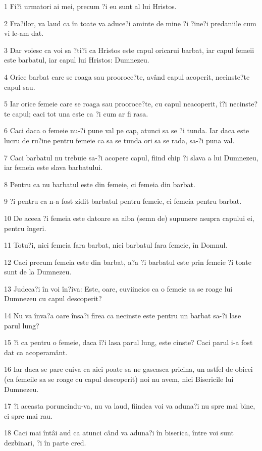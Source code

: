 \par 1 Fi?i urmatori ai mei, precum ?i eu sunt al lui Hristos.
\par 2 Fra?ilor, va laud ca în toate va aduce?i aminte de mine ?i ?ine?i predaniile cum vi le-am dat.
\par 3 Dar voiesc ca voi sa ?ti?i ca Hristos este capul oricarui barbat, iar capul femeii este barbatul, iar capul lui Hristos: Dumnezeu.
\par 4 Orice barbat care se roaga sau prooroce?te, având capul acoperit, necinste?te capul sau.
\par 5 Iar orice femeie care se roaga sau prooroce?te, cu capul neacoperit, î?i necinste?te capul; caci tot una este ca ?i cum ar fi rasa.
\par 6 Caci daca o femeie nu-?i pune val pe cap, atunci sa se ?i tunda. Iar daca este lucru de ru?ine pentru femeie ca sa se tunda ori sa se rada, sa-?i puna val.
\par 7 Caci barbatul nu trebuie sa-?i acopere capul, fiind chip ?i slava a lui Dumnezeu, iar femeia este slava barbatului.
\par 8 Pentru ca nu barbatul este din femeie, ci femeia din barbat.
\par 9 ?i pentru ca n-a fost zidit barbatul pentru femeie, ci femeia pentru barbat.
\par 10 De aceea ?i femeia este datoare sa aiba (semn de) supunere asupra capului ei, pentru îngeri.
\par 11 Totu?i, nici femeia fara barbat, nici barbatul fara femeie, în Domnul.
\par 12 Caci precum femeia este din barbat, a?a ?i barbatul este prin femeie ?i toate sunt de la Dumnezeu.
\par 13 Judeca?i în voi în?iva: Este, oare, cuviincios ca o femeie sa se roage lui Dumnezeu cu capul descoperit?
\par 14 Nu va înva?a oare însa?i firea ca necinste este pentru un barbat sa-?i lase parul lung?
\par 15 ?i ca pentru o femeie, daca î?i lasa parul lung, este cinste? Caci parul i-a fost dat ca acoperamânt.
\par 16 Iar daca se pare cuiva ca aici poate sa ne gaseasca pricina, un astfel de obicei (ca femeile sa se roage cu capul descoperit) noi nu avem, nici Bisericile lui Dumnezeu.
\par 17 ?i aceasta poruncindu-va, nu va laud, fiindca voi va aduna?i nu spre mai bine, ci spre mai rau.
\par 18 Caci mai întâi aud ca atunci când va aduna?i în biserica, între voi sunt dezbinari, ?i în parte cred.
